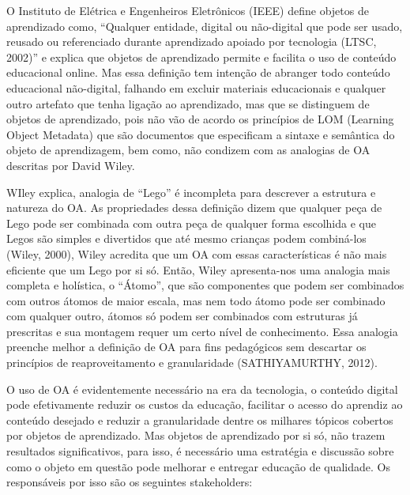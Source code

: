 \documentclass[12pt,openright,oneside,a4paper,english,french,spanish,brazil]{unifil}
\begin{document}
\par O Instituto de Elétrica e Engenheiros Eletrônicos (IEEE) define objetos de aprendizado como, ``Qualquer entidade, digital ou não-digital que pode ser usado, reusado ou referenciado durante aprendizado apoiado por tecnologia (LTSC, 2002)'' e explica que objetos de aprendizado permite e facilita o uso de conteúdo educacional online. Mas essa definição tem intenção de abranger todo conteúdo educacional não-digital, falhando em excluir materiais educacionais e qualquer outro artefato que tenha ligação ao aprendizado, mas que se distinguem de objetos de aprendizado, pois não vão de acordo os princípios de LOM (Learning Object Metadata) que são documentos que especificam a sintaxe e semântica do objeto de aprendizagem, bem como, não condizem com as analogias de OA descritas por David Wiley.
\par WIley explica, analogia de ``Lego'' é incompleta para descrever a estrutura e natureza do OA. As propriedades dessa definição dizem que qualquer peça de Lego pode ser combinada com outra peça de qualquer forma escolhida e que Legos são simples e divertidos que até mesmo crianças podem combiná-los (Wiley, 2000), Wiley acredita que um OA com essas características é não mais eficiente que um Lego por si só. Então, Wiley apresenta-nos uma analogia mais completa e holística, o ``Átomo'', que são componentes que podem ser combinados com outros átomos de maior escala, mas nem todo átomo pode ser combinado com qualquer outro, átomos só podem ser combinados com estruturas já prescritas e sua montagem requer um certo nível de conhecimento. Essa analogia preenche melhor a definição de OA para fins pedagógicos sem descartar os princípios de reaproveitamento e granularidade (\uppercase{Sathiyamurthy}, 2012).

O uso de OA é evidentemente necessário na era da tecnologia, o conteúdo digital pode efetivamente reduzir os custos da educação, facilitar o acesso do aprendiz ao conteúdo desejado e reduzir a granularidade dentre os milhares tópicos cobertos por objetos de aprendizado.
Mas objetos de aprendizado por si só, não trazem resultados significativos, para isso, é necessário uma estratégia e discussão sobre como o objeto em questão pode melhorar e entregar educação de qualidade. Os responsáveis por isso são os seguintes stakeholders:
\end{document}
